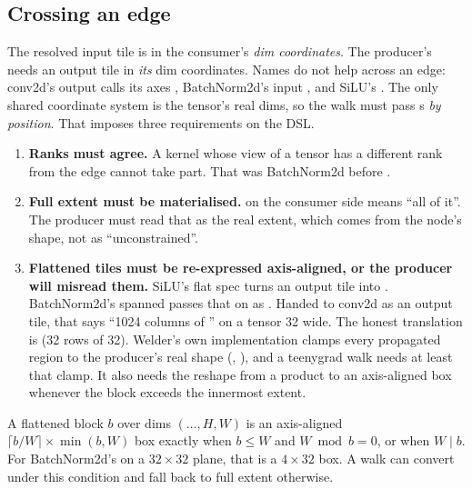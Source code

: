 \subsection{Crossing an edge}
\label{sec:edges}

The resolved input tile is in the consumer's \emph{dim coordinates}. The producer's
 needs an output tile in \emph{its} dim coordinates. Names do
not help across an edge: conv2d's output calls its axes ,
BatchNorm2d's input , and SiLU's . The only shared
coordinate system is the tensor's real dims, so the walk must pass s
\emph{by position}. That imposes three requirements on the DSL.

\begin{enumerate}
\item \textbf{Ranks must agree.} A kernel whose view of a tensor has a different rank
  from the edge cannot take part. That was BatchNorm2d before .
\item \textbf{Full extent must be materialised.}  on the consumer side
  means ``all of it''. The producer must read that as the real extent, which comes
  from the node's shape, not as ``unconstrained''.
\item \textbf{Flattened tiles must be re-expressed axis-aligned, or the producer will
  misread them.} SiLU's flat spec turns an output tile into \code{[1, 1, 1, 1024]}.
  BatchNorm2d's spanned  passes that on as \code{[_, _, 1, 1024]}. Handed to
  conv2d as an output tile, that says ``1024 columns of '' on a tensor 32
  wide. The honest translation is \code{[_, _, 32, 32]} (32 rows of 32). Welder's own
  implementation clamps every propagated region to the producer's real shape
  (, ), and a teenygrad walk needs at least
  that clamp. It also needs the reshape from a product to an axis-aligned box
  whenever the block exceeds the innermost extent.
\end{enumerate}

\begin{note}
A flattened block $b$ over dims $(\ldots, H, W)$ is an axis-aligned
$\lceil b/W\rceil \times \min(b, W)$ box exactly when $b \le W$ and $W \bmod b = 0$,
or when $W \mid b$. For BatchNorm2d's  on a $32\times32$ plane,
that is a $4\times32$ box. A walk can convert under this condition and fall back to
full extent otherwise.
\end{note}
